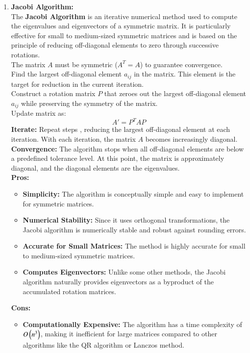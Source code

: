 \documentclass[journal]{IEEEtran}
\begin{document}
\begin{enumerate}
\begin{itemize}
\end{itemize}
\item \textbf{Jacobi Algorithm:}\\
The \textbf{Jacobi Algorithm} is an iterative numerical method used to compute the eigenvalues and eigenvectors of a symmetric matrix. It is particularly effective for small to medium-sized symmetric matrices and is based on the principle of reducing off-diagonal elements to zero through successive rotations.\\The matrix $A$ must be symmetric ($A^T=A$) to guarantee convergence.\\
Find the largest off-diagonal element $a_{ij}$ in the matrix. This element is the target for reduction in the current iteration.\\
Construct a rotation matrix $P$ that zeroes out the largest off-diagonal element $a_{ij}$ while preserving the symmetry of the matrix.\\
Update matrix as:
\[ A' = P^T A P \]
\textbf{Iterate:} Repeat steps , reducing the largest off-diagonal element at each iteration. With each iteration, the matrix $A$ becomes increasingly diagonal.\\
\textbf{Convergence:} The algorithm stops when all off-diagonal elements are below a predefined tolerance level. At this point, the matrix is approximately diagonal, and the diagonal elements are the eigenvalues.\\
\textbf{Pros:}
\begin{itemize}
\item \textbf{Simplicity:} The algorithm is conceptually simple and easy to implement for symmetric matrices.
\item \textbf{Numerical Stability:} Since it uses orthogonal transformations, the Jacobi algorithm is numerically stable and robust against rounding errors.\item \textbf{Accurate for Small Matrices:} The method is highly accurate for small to medium-sized symmetric matrices.
\item \textbf{Computes Eigenvectors:} Unlike some other methods, the Jacobi algorithm naturally provides eigenvectors as a byproduct of the accumulated rotation matrices.
\end{itemize}
\textbf{Cons:} 
\begin{itemize}
	\item \textbf{Computationally Expensive:} The algorithm has a time complexity of $O\left(n^3\right)$, making it inefficient for large matrices compared to other algorithms like the QR algorithm or Lanczos method.

\end{itemize}
\end{enumerate}
\end{document}
